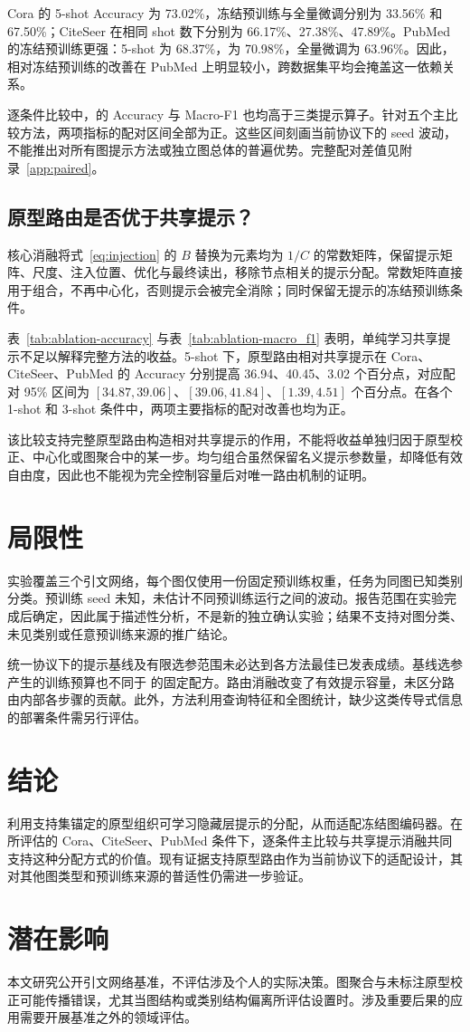 Cora 的 5-shot Accuracy 为 73.02\%，冻结预训练与全量微调分别为 33.56\% 和 67.50\%；CiteSeer 在相同 shot 数下分别为 66.17\%、27.38\%、47.89\%。PubMed 的冻结预训练更强：5-shot 为 68.37\%，\method 为 70.98\%，全量微调为 63.96\%。因此，相对冻结预训练的改善在 PubMed 上明显较小，跨数据集平均会掩盖这一依赖关系。

逐条件比较中，\method 的 Accuracy 与 Macro-F1 也均高于三类提示算子。针对五个主比较方法，两项指标的配对区间全部为正。这些区间刻画当前协议下的 seed 波动，不能推出对所有图提示方法或独立图总体的普遍优势。完整配对差值见附录~\ref{app:paired}。

\subsection{原型路由是否优于共享提示？}
核心消融将式~\eqref{eq:injection} 的 $B$ 替换为元素均为 $1/C$ 的常数矩阵，保留提示矩阵、尺度、注入位置、优化与最终读出，移除节点相关的提示分配。常数矩阵直接用于组合，不再中心化，否则提示会被完全消除；同时保留无提示的冻结预训练条件。



表~\ref{tab:ablation-accuracy} 与表~\ref{tab:ablation-macro_f1} 表明，单纯学习共享提示不足以解释完整方法的收益。5-shot 下，原型路由相对共享提示在 Cora、CiteSeer、PubMed 的 Accuracy 分别提高 36.94、40.45、3.02 个百分点，对应配对 95\% 区间为 $[34.87,39.06]$、$[39.06,41.84]$、$[1.39,4.51]$ 个百分点。在各个 1-shot 和 3-shot 条件中，两项主要指标的配对改善也均为正。

该比较支持完整原型路由构造相对共享提示的作用，不能将收益单独归因于原型校正、中心化或图聚合中的某一步。均匀组合虽然保留名义提示参数量，却降低有效自由度，因此也不能视为完全控制容量后对唯一路由机制的证明。

\section{局限性}
实验覆盖三个引文网络，每个图仅使用一份固定预训练权重，任务为同图已知类别分类。预训练 seed 未知，未估计不同预训练运行之间的波动。报告范围在实验完成后确定，因此属于描述性分析，不是新的独立确认实验；结果不支持对图分类、未见类别或任意预训练来源的推广结论。

统一协议下的提示基线及有限选参范围未必达到各方法最佳已发表成绩。基线选参产生的训练预算也不同于 \method 的固定配方。路由消融改变了有效提示容量，未区分路由内部各步骤的贡献。此外，方法利用查询特征和全图统计，缺少这类传导式信息的部署条件需另行评估。

\section{结论}
\method 利用支持集锚定的原型组织可学习隐藏层提示的分配，从而适配冻结图编码器。在所评估的 Cora、CiteSeer、PubMed 条件下，逐条件主比较与共享提示消融共同支持这种分配方式的价值。现有证据支持原型路由作为当前协议下的适配设计，其对其他图类型和预训练来源的普适性仍需进一步验证。

\section*{潜在影响}
本文研究公开引文网络基准，不评估涉及个人的实际决策。图聚合与未标注原型校正可能传播错误，尤其当图结构或类别结构偏离所评估设置时。涉及重要后果的应用需要开展基准之外的领域评估。
